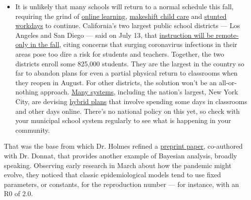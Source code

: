 \begin{itemize}
  \begin{itemize}
  \tightlist
  \item
    It is unlikely that many schools will return to a normal schedule
    this fall, requiring the grind of
    \href{https://www.nytimes3xbfgragh.onion/2020/06/05/us/coronavirus-education-lost-learning.html?action=click\&pgtype=Article\&state=default\&region=MAIN_CONTENT_3\&context=storylines_faq}{online
    learning},
    \href{https://www.nytimes3xbfgragh.onion/2020/05/29/us/coronavirus-child-care-centers.html?action=click\&pgtype=Article\&state=default\&region=MAIN_CONTENT_3\&context=storylines_faq}{makeshift
    child care} and
    \href{https://www.nytimes3xbfgragh.onion/2020/06/03/business/economy/coronavirus-working-women.html?action=click\&pgtype=Article\&state=default\&region=MAIN_CONTENT_3\&context=storylines_faq}{stunted
    workdays} to continue. California's two largest public school
    districts --- Los Angeles and San Diego --- said on July 13, that
    \href{https://www.nytimes3xbfgragh.onion/2020/07/13/us/lausd-san-diego-school-reopening.html?action=click\&pgtype=Article\&state=default\&region=MAIN_CONTENT_3\&context=storylines_faq}{instruction
    will be remote-only in the fall}, citing concerns that surging
    coronavirus infections in their areas pose too dire a risk for
    students and teachers. Together, the two districts enroll some
    825,000 students. They are the largest in the country so far to
    abandon plans for even a partial physical return to classrooms when
    they reopen in August. For other districts, the solution won't be an
    all-or-nothing approach.
    \href{https://bioethics.jhu.edu/research-and-outreach/projects/eschool-initiative/school-policy-tracker/}{Many
    systems}, including the nation's largest, New York City, are
    devising
    \href{https://www.nytimes3xbfgragh.onion/2020/06/26/us/coronavirus-schools-reopen-fall.html?action=click\&pgtype=Article\&state=default\&region=MAIN_CONTENT_3\&context=storylines_faq}{hybrid
    plans} that involve spending some days in classrooms and other days
    online. There's no national policy on this yet, so check with your
    municipal school system regularly to see what is happening in your
    community.
  \end{itemize}
\end{itemize}

That was the base from which Dr. Holmes refined a
\href{https://arxiv.org/abs/2004.05272}{preprint paper}, co-authored
with Dr. Donnat, that provides another example of Bayesian analysis,
broadly speaking. Observing early research in March about how the
pandemic might evolve, they noticed that classic epidemiological models
tend to use fixed parameters, or constants, for the reproduction number
--- for instance, with an R0 of 2.0.

